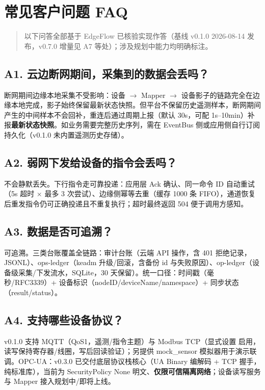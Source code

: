 \appendix
\chapter{常见客户问题 FAQ}

\begin{quote}
以下问答全部基于 EdgeFlow 已核验实现作答（基线 v0.1.0 2026-08-14 发布，v0.7.0 增量见 A7 等处）；涉及规划中能力均明确标注。
\end{quote}

\section*{A1. 云边断网期间，采集到的数据会丢吗？}

断网期间边缘本地采集不受影响：设备 $\rightarrow$ Mapper $\rightarrow$ 设备影子的链路完全在边缘本地完成，影子始终保留最新状态快照。但平台不保留历史遥测样本，断网期间产生的中间样本不会回补，重连后通过周期上报（默认 30s，可配 1s--10min）补报\textbf{最新状态快照}。如业务需要完整历史序列，需在 EventBus 侧或应用侧自行订阅持久化（v0.1.0 未内置遥测历史存储）。

\section*{A2. 弱网下发给设备的指令会丢吗？}

不会静默丢失。下行指令走可靠投递：应用层 Ack 确认、同一命令 ID 自动重试（5s 超时 $\times$ 最多 3 次尝试）、边缘侧幂等去重（缓存 1000 条 FIFO），通道恢复后重发指令仍可正确投递且不重复执行；超时最终返回 504 便于调用方感知。

\section*{A3. 数据是否可追溯？}

可追溯。三类台账覆盖全链路：审计台账（云端 API 操作，含 401 拒绝记录，JSONL）、ops-ledger（keadm 升级/回滚，含备份 id 与失败原因）、op-ledger（设备级采集/下发流水，SQLite，30 天保留）。统一口径：时间戳（毫秒/RFC3339）+ 设备标识（nodeID/deviceName/namespace）+ 同步状态（result/status）。

\section*{A4. 支持哪些设备协议？}

v0.1.0 支持 MQTT（QoS1，遥测/指令主题）与 Modbus TCP（显式设置  启用，读写保持寄存器/线圈，写后回读验证）；另提供 mock\_sensor 模拟器用于演示联调。OPC-UA：v0.3.0 已交付底层协议栈核心（UA Binary 编解码 + TCP 握手，纯标准库），当前为 SecurityPolicy None 明文、\textbf{仅限可信隔离网络}；设备读写服务与 Mapper 接入规划中/即将上线。

